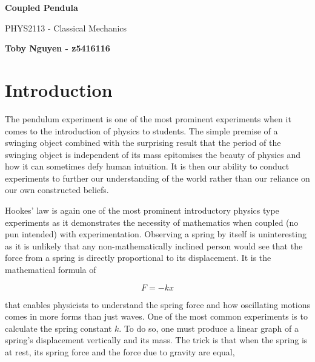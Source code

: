 \documentclass{article}
\begin{document}
\begin{titlepage}
    \begin{center}
        \vspace*{7cm}

        \Huge
        \textbf{Coupled Pendula}

        \vspace{0.5cm}
        \LARGE
        PHYS2113 - Classical Mechanics

        \vspace{1.5cm}

        \textbf{Toby Nguyen - z5416116}
    \end{center}
\end{titlepage}

\tableofcontents

\newpage

\section{Introduction}
The pendulum experiment is one of the most prominent experiments when it 
comes to the introduction of physics to students. The simple premise of a 
swinging object combined with the surprising result that the period of the 
swinging object is independent of its mass epitomises the beauty of physics 
and how it can sometimes defy human intuition. It is then our ability to 
conduct experiments to further our understanding of the world rather than 
our reliance on our own constructed beliefs.

Hookes' law is again one of the most prominent introductory physics type 
experiments as it demonstrates the necessity of mathematics when coupled 
(no pun intended) with experimentation. Observing a spring by itself is 
uninteresting as it is unlikely that any non-mathematically inclined person
would see that the force from a spring is directly proportional to its 
displacement. It is the mathematical formula of 

\begin{equation}
    F = -kx
\end{equation}

that enables physicists to understand the spring force and how oscillating
motions comes in more forms than just waves. One of the most common experiments
is to calculate the spring constant $k$. To do so, one must produce a linear
graph of a spring's displacement vertically and its mass. The trick is that 
when the spring is at rest, its spring force and the force due to gravity are
equal,
\end{document}
